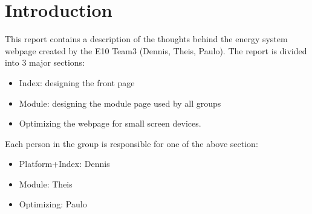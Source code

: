 \chapter{Introduction}
This report contains a description of the thoughts behind the energy system webpage created by the E10 Team3 (Dennis, Theis, Paulo). The report is divided into 3 major sections:
\begin{itemize}
	\item Index: designing the front page
	\item Module: designing the module page used by all groups
	\item Optimizing the webpage for small screen devices.
\end{itemize}
Each person in the group is responsible for one of the above section:
\begin{itemize}
	\item Platform+Index: Dennis
	\item Module: Theis
	\item Optimizing: Paulo
\end{itemize}
